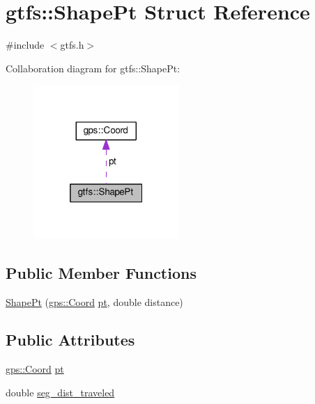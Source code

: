 \hypertarget{structgtfs_1_1ShapePt}{}\section{gtfs\+:\+:Shape\+Pt Struct Reference}
\label{structgtfs_1_1ShapePt}


{\ttfamily \#include $<$gtfs.\+h$>$}



Collaboration diagram for gtfs\+:\+:Shape\+Pt\+:\nopagebreak
\begin{figure}[H]
\begin{center}
\leavevmode
\includegraphics[width=157pt]{structgtfs_1_1ShapePt__coll__graph}
\end{center}
\end{figure}
\subsection*{Public Member Functions}
\begin{DoxyCompactItemize}
\item 
\hyperlink{structgtfs_1_1ShapePt_a34e7da183770e2ab8360e286596ff18a}{Shape\+Pt} (\hyperlink{classgps_1_1Coord}{gps\+::\+Coord} \hyperlink{structgtfs_1_1ShapePt_ab79eb8263213afd27be9b257fca8515a}{pt}, double distance)
\end{DoxyCompactItemize}
\subsection*{Public Attributes}
\begin{DoxyCompactItemize}
\item 
\hyperlink{classgps_1_1Coord}{gps\+::\+Coord} \hyperlink{structgtfs_1_1ShapePt_ab79eb8263213afd27be9b257fca8515a}{pt}
\item 
double \hyperlink{structgtfs_1_1ShapePt_ad3fe477575279af15fe33e0ce36eaad2}{seg\+\_\+dist\+\_\+traveled}
\end{DoxyCompactItemize}


